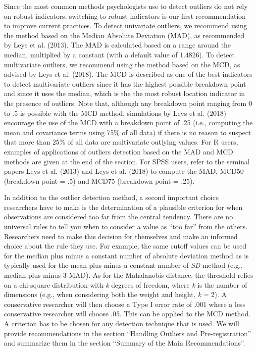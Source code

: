 \documentclass[man,floatsintext]{apa6}
\begin{document}
Since the most common methods psychologists use to detect outliers do
not rely on robust indicators, switching to robust indicators is our
first recommendation to improve current practices. To detect univariate
outliers, we recommend using the method based on the Median Absolute
Deviation (MAD), as recommended by Leys et al. (2013). The MAD is
calculated based on a range around the median, multiplied by a constant
(with a default value of 1.4826). To detect multivariate outliers, we
recommend using the method based on the MCD, as advised by Leys et al.
(2018). The MCD is described as one of the best indicators to detect
multivariate outliers since it has the highest possible breakdown point
and since it uses the median, which is the the most robust location
indicator in the presence of outliers. Note that, although any breakdown
point ranging from 0 to .5 is possible with the MCD method, simulations
by Leys et al. (2018) encourage the use of the MCD with a breakdown
point of .25 (i.e., computing the mean and covariance terms using 75\%
of all data) if there is no reason to suspect that more than 25\% of all
data are multivariate outlying values. For R users, examples of
applications of outliers detection based on the MAD and MCD methods are
given at the end of the section. For SPSS users, refer to the seminal
papers Leys et al. (2013) and Leys et al. (2018) to compute the MAD,
MCD50 (breakdown point = .5) and MCD75 (breakdown point = .25).

In addition to the outlier detection method, a second important choice
researchers have to make is the determination of a plausible criterion
for when observations are considered too far from the central tendency.
There are no universal rules to tell you when to consider a value as
\enquote{too far} from the others. Researchers need to make this
decision for themselves and make an informed choice about the rule they
use. For example, the same cutoff values can be used for the median plus
minus a constant number of absolute deviation method as is typically
used for the mean plus minus a constant number of \emph{SD} method
(e.g., median plus minus 3 MAD). As for the Mahalanobis distance, the
threshold relies on a chi-square distribution with \emph{k} degrees of
freedom, where \emph{k} is the number of dimensions (e.g., when
considering both the weight and height, \emph{k }= 2). A conservative
researcher will then choose a Type I error rate of .001 where a less
conservative researcher will choose .05. This can be applied to the MCD
method. A criterion has to be chosen for any detection technique that is
used. We will provide recommendations in the section \enquote{Handling
Outliers and Pre-registration} and summarize them in the section
\enquote{Summary of the Main Recommendations}.
\end{document}
